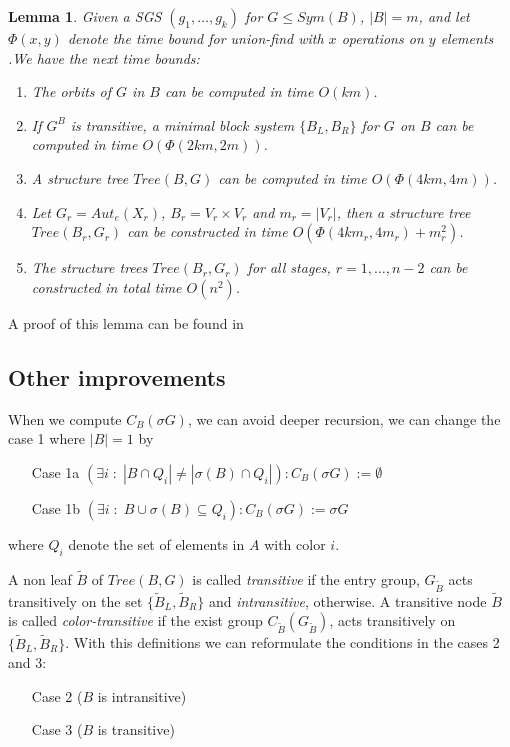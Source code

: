 \documentclass[12pt,a4paper]{book}
\theoremstyle{plain}
\newtheorem{lema}{Lemma}
\theoremstyle{definition}
\theoremstyle{remark}
\begin{document}
\begin{lema}
 Given a SGS $(g_1, \ldots, g_k)$ for $G \leq Sym(B)$, $|B|=m$, and let $\Phi(x,y)$ denote the time bound for union-find with 
 $x$ operations on $y$ elements \cite{Aho:1974:DAC:578775}.We have the next time bounds:
 \begin{enumerate}
  \item The orbits of $G$ in $B$ can be computed in time $O(km)$.
  \item If $G^B$ is transitive, a minimal block system $\{ B_L, B_R \}$ for $G$ on $B$ can be computed in time $O( \Phi (2km, 2m))$.
  \item A structure tree $Tree(B,G)$ can be computed in time $O(\Phi(4km,4m))$.
  \item Let $G_r = Aut_e(X_r)$, $B_r = V_r \times V_r$ and $m_r = | V_r|$, then a structure tree $Tree(B_r, G_r)$ can be constructed 
  in time $O( \Phi(4km_r, 4 m_r) + m_r^2 )$. 
  \item The structure trees $Tree(B_r, G_r)$ for all stages, $r=1, \ldots, n-2$ can be constructed in total time $O(n^2)$.
 \end{enumerate}

\end{lema}
A proof of this lemma can be found in \cite{ GaHoLuScWe87}

\subsection{Other improvements}

When we compute $C_B(\sigma G)$, we can avoid deeper recursion, we can change the case 1 where $|B|=1$ by
\begin{itemize}
 \item[Case 1a] $( \exists i \; : \; | B \cap Q_i | \neq | \sigma (B) \cap Q_i | ) : C_B ( \sigma G) := \emptyset$
 \item[Case 1b] $(\exists i \; : \; B \cup \sigma(B) \subseteq Q_i ): C_B( \sigma G) := \sigma G$
\end{itemize}
where $Q_i$ denote the set of elements in $A$ with color $i$.

A non leaf $\tilde{B}$ of $Tree(B,G)$ is called \emph{transitive} if the entry group, $G_{\tilde{B}}$ acts transitively on the set 
$\{ \tilde{B}_L, \tilde{B}_R \}$ and \emph{intransitive}, otherwise. A transitive node $\tilde{B}$ is called \emph{color-transitive}
if the exist group $C_{\tilde{B}} ( G_{\tilde{B}})$, acts transitively on $\{ \tilde{B}_L, \tilde{B}_R \}$. With this definitions 
we can reformulate the conditions in the cases 2 and 3:
\begin{itemize}
 \item[Case 2] ($B$ is intransitive)
 \item[Case 3] ($B$ is transitive)
\end{itemize}
\end{document}
